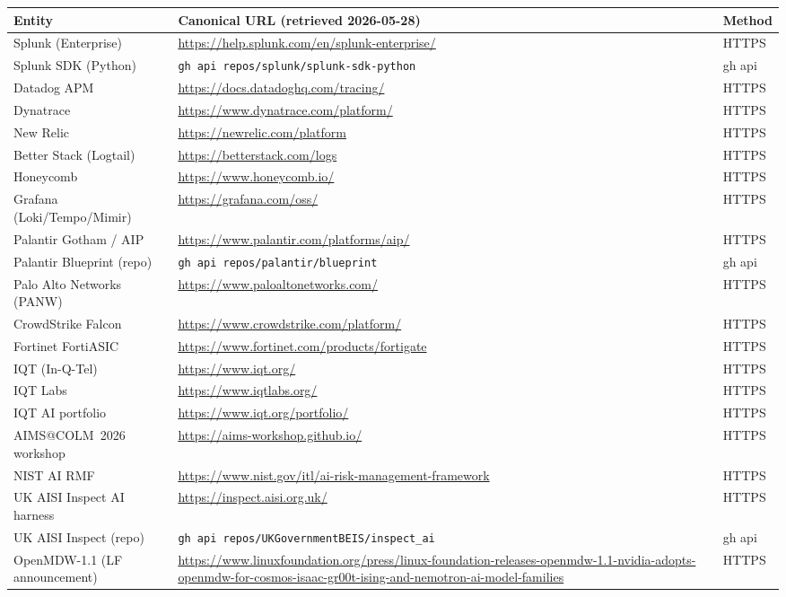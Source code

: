 \begin{center}
\small
\begin{tabular}{p{4.0cm}p{8.5cm}p{2.0cm}}
\textbf{Entity} & \textbf{Canonical URL (retrieved 2026-05-28)} & \textbf{Method} \\
\hline
Splunk (Enterprise) & \url{https://help.splunk.com/en/splunk-enterprise/} & HTTPS \\
Splunk SDK (Python) & \texttt{gh api repos/splunk/splunk-sdk-python} & gh api \\
Datadog APM & \url{https://docs.datadoghq.com/tracing/} & HTTPS \\
Dynatrace & \url{https://www.dynatrace.com/platform/} & HTTPS \\
New Relic & \url{https://newrelic.com/platform} & HTTPS \\
Better Stack (Logtail) & \url{https://betterstack.com/logs} & HTTPS \\
Honeycomb & \url{https://www.honeycomb.io/} & HTTPS \\
Grafana (Loki/Tempo/Mimir) & \url{https://grafana.com/oss/} & HTTPS \\
Palantir Gotham / AIP & \url{https://www.palantir.com/platforms/aip/} & HTTPS \\
Palantir Blueprint (repo) & \texttt{gh api repos/palantir/blueprint} & gh api \\
Palo Alto Networks (PANW) & \url{https://www.paloaltonetworks.com/} & HTTPS \\
CrowdStrike Falcon & \url{https://www.crowdstrike.com/platform/} & HTTPS \\
Fortinet FortiASIC & \url{https://www.fortinet.com/products/fortigate} & HTTPS \\
IQT (In-Q-Tel) & \url{https://www.iqt.org/} & HTTPS \\
IQT Labs & \url{https://www.iqtlabs.org/} & HTTPS \\
IQT AI portfolio & \url{https://www.iqt.org/portfolio/} & HTTPS \\
AIMS@COLM~2026 workshop & \url{https://aims-workshop.github.io/} & HTTPS \\
NIST AI RMF & \url{https://www.nist.gov/itl/ai-risk-management-framework} & HTTPS \\
UK AISI Inspect AI harness & \url{https://inspect.aisi.org.uk/} & HTTPS \\
UK AISI Inspect (repo) & \texttt{gh api repos/UKGovernmentBEIS/inspect\_ai} & gh api \\
OpenMDW-1.1 (LF announcement) & \url{https://www.linuxfoundation.org/press/linux-foundation-releases-openmdw-1.1-nvidia-adopts-openmdw-for-cosmos-isaac-gr00t-ising-and-nemotron-ai-model-families} & HTTPS \\

\end{tabular}
\end{center}
